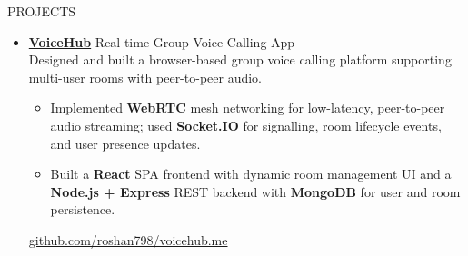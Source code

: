 \documentclass{resume}
\begin{document}
\begin{rSection}{PROJECTS}
\begin{itemize}



\item \href{https://github.com/roshan798/voicehub.me}{\textbf{VoiceHub}}
  \hfill Real-time Group Voice Calling App\\
  Designed and built a browser-based group voice calling platform supporting
  multi-user rooms with peer-to-peer audio.
  \begin{itemize}
    \itemsep -3pt
    \item Implemented \textbf{WebRTC} mesh networking for low-latency,
          peer-to-peer audio streaming; used \textbf{Socket.IO} for signalling,
          room lifecycle events, and user presence updates.
    \item Built a \textbf{React} SPA frontend with dynamic room management UI
          and a \textbf{Node.js + Express} REST backend with \textbf{MongoDB}
          for user and room persistence.
  \end{itemize}
  \href{https://github.com/roshan798/voicehub.me}{github.com/roshan798/voicehub.me}




\end{itemize}
\end{rSection}
\end{document}
